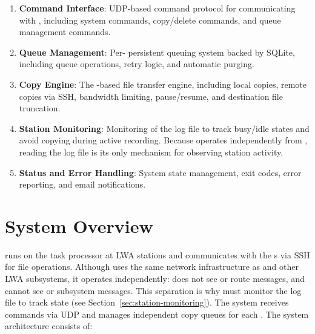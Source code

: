\begin{enumerate}
    \item \textbf{Command Interface}: UDP-based command protocol for communicating with \SC{}, including system commands, copy/delete commands, and queue management commands.

    \item \textbf{Queue Management}: Per-\DR{} persistent queuing system backed by SQLite, including queue operations, retry logic, and automatic purging.

    \item \textbf{Copy Engine}: The -based file transfer engine, including local copies, remote copies via SSH, bandwidth limiting, pause/resume, and destination file truncation.

    \item \textbf{Station Monitoring}: Monitoring of the \MCS{} log file to track \DR{} busy/idle states and avoid copying during active recording. Because \SC{} operates independently from \MCS{}, reading the log file is its only mechanism for observing station activity.

    \item \textbf{Status and Error Handling}: System state management, exit codes, error reporting, and email notifications.
\end{enumerate}

\section{System Overview}

\SC{} runs on the \MCS{} task processor at LWA stations and communicates with the \DR{}s via SSH for file operations. Although \SC{} uses the same network infrastructure as \MCS{} and other LWA subsystems, it operates independently: \MCS{} does not see or route \SC{} messages, and \SC{} cannot see \MCS{} or subsystem messages. This separation is why \SC{} must monitor the \MCS{} log file to track \DR{} state (see Section~\ref{sec:station-monitoring}). The system receives commands via UDP and manages independent copy queues for each \DR{}. The system architecture consists of:

